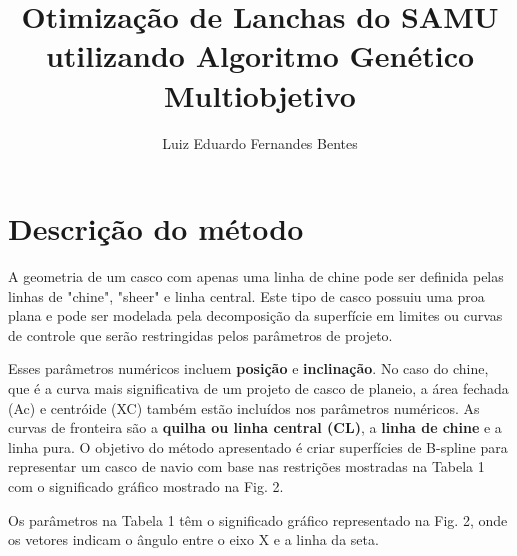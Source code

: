 \documentclass[]{article}
\title{Otimização de Lanchas do SAMU utilizando Algoritmo Genético Multiobjetivo}
\author{Luiz Eduardo Fernandes Bentes}
\begin{document}
\maketitle

\begin{abstract}

\end{abstract}

\section{Descrição do método}
A geometria de um casco com apenas uma linha de chine pode ser definida pelas linhas de "chine", "sheer" e linha central. Este tipo de casco possuiu uma proa plana e pode ser modelada pela decomposição da superfície em limites ou curvas de controle que serão restringidas pelos parâmetros de projeto.

Esses parâmetros numéricos incluem \textbf{posição} e \textbf{inclinação}. No caso do chine, que é a curva mais significativa de um projeto de casco de planeio, a área fechada (Ac) e centróide (XC) também estão incluídos nos parâmetros numéricos. As curvas de fronteira são a \textbf{quilha ou linha central (CL)}, a \textbf{linha de chine} e a linha pura. O objetivo do método apresentado é criar superfícies de B-spline para representar um casco de navio com base nas restrições mostradas na Tabela 1 com o significado gráfico mostrado na Fig. 2. 

Os parâmetros na Tabela 1 têm o significado gráfico representado na Fig. 2, onde os vetores indicam o ângulo entre o eixo X e a linha da seta.
\end{document}
